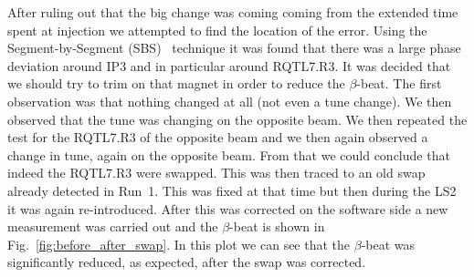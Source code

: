 \documentclass[a4paper]{cernatsnote}
\begin{document}
After ruling out that the big change was coming coming from the extended time spent at injection we attempted to find the location of the error. Using the Segment-by-Segment (SBS)~\cite{} technique it was found that there was a large phase deviation around IP3 and in particular around RQTL7.R3. It was decided that we should try to trim on that magnet in order to reduce the $\beta$-beat. The first observation was that nothing changed at all (not even a tune change). We then observed that the tune was changing on the opposite beam. We then repeated the test for the RQTL7.R3 of the opposite beam and we then again observed a change in tune, again on the opposite beam. From that we could conclude that indeed the RQTL7.R3 were swapped. This was then traced to an old swap already detected in Run~1. This was fixed at that time but then during the LS2 it was again re-introduced. After this was corrected on the software side a new measurement was carried out and the $\beta$-beat is shown in Fig.~\ref{fig:before_after_swap}. In this plot we can see that the $\beta$-beat was significantly reduced, as expected, after the swap was corrected.  
\end{document}
